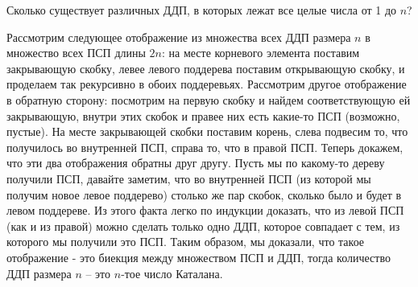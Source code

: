 \begin{center} 
\end{center}

\begin{problem}
    Сколько существует различных ДДП, в которых лежат все целые числа от 1 до $n$? 
\end{problem}

\begin{solution}
    Рассмотрим следующее отображение из множества всех ДДП размера $n$ в множество всех ПСП длины $2n$: на месте корневого элемента поставим закрывающую скобку, левее левого поддерева поставим открывающую скобку, и проделаем так рекурсивно в обоих поддеревьях. Рассмотрим другое отображение в обратную сторону: посмотрим на первую скобку и найдем соответствующую ей закрывающую, внутри этих скобок и правее них есть какие-то ПСП (возможно, пустые). На месте закрывающей скобки поставим корень, слева подвесим то, что получилось во внутренней ПСП, справа то, что в правой ПСП. Теперь докажем, что эти два отображения обратны друг другу. Пусть мы по какому-то дереву получили ПСП, давайте заметим, что во внутренней ПСП (из которой мы получим новое левое поддерево) столько же пар скобок, сколько было и будет в левом поддереве. Из этого факта легко по индукции доказать, что из левой ПСП (как и из правой) можно сделать только одно ДДП, которое совпадает с тем, из которого мы получили это ПСП. Таким образом, мы доказали, что такое отображение - это биекция между множеством ПСП и ДДП, тогда количество ДДП размера $n$ -- это $n$-тое число Каталана.
\end{solution}

